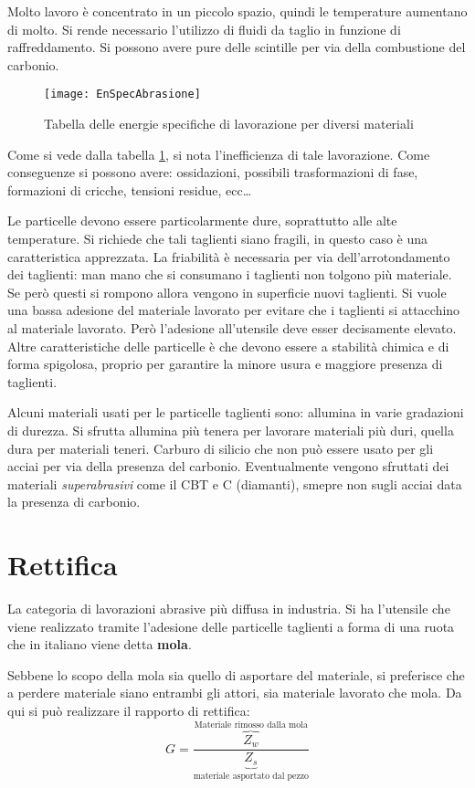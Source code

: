Molto lavoro è concentrato in un piccolo spazio, quindi le temperature aumentano di molto. Si rende necessario l'utilizzo di fluidi da taglio in funzione di raffreddamento. Si possono avere pure delle scintille per via della combustione del carbonio.

\begin{figure}
\centering
\texttt{[image: EnSpecAbrasione]}
\caption{Tabella delle energie specifiche di lavorazione per diversi materiali}
\label{fig:EnSpecAbrasione}
\end{figure}

Come si vede dalla tabella \ref{fig:EnSpecAbrasione}, si nota l'inefficienza di tale lavorazione.
Come conseguenze si possono avere: ossidazioni, possibili trasformazioni di fase, formazioni di cricche, tensioni residue, ecc\dots

Le particelle devono essere particolarmente dure, soprattutto alle alte temperature.
Si richiede che tali taglienti siano fragili, in questo caso è una caratteristica apprezzata. La friabilità è necessaria per via dell'arrotondamento dei taglienti: man mano che si consumano i taglienti non tolgono più materiale. Se però questi si rompono allora vengono in superficie nuovi taglienti.
Si vuole una bassa adesione del materiale lavorato per evitare che i taglienti si attacchino al materiale lavorato. Però l'adesione all'utensile deve esser decisamente elevato.
Altre caratteristiche delle particelle è che devono essere a stabilità chimica e di forma spigolosa, proprio per garantire la minore usura e maggiore presenza di taglienti.

Alcuni materiali usati per le particelle taglienti sono: allumina in varie gradazioni di durezza. Si sfrutta allumina più tenera per lavorare materiali più duri, quella dura per materiali teneri. 
Carburo di silicio che non può essere usato per gli acciai per via della presenza del carbonio. 
Eventualmente vengono sfruttati dei materiali \textit{superabrasivi} come il CBT e C (diamanti), smepre non sugli acciai data la presenza di carbonio.

\section{Rettifica}
La categoria di lavorazioni abrasive più diffusa in industria. Si ha l'utensile che viene realizzato tramite l'adesione delle particelle taglienti a forma di una ruota che in italiano viene detta \textbf{mola}.

Sebbene lo scopo della mola sia quello di asportare del materiale, si preferisce che a perdere materiale siano entrambi gli attori, sia materiale lavorato che mola.
Da qui si può realizzare il rapporto di rettifica:
\begin{equation}
G = \frac{\overbrace{Z_w}^{\text{Materiale rimosso dalla mola}}}{\underbrace{Z_s}_{\text{materiale asportato dal pezzo}}}
\end{equation}

